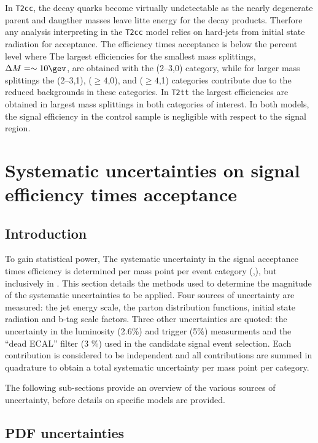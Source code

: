 In \verb!T2cc!, the decay quarks become virtually undetectable as 
the nearly degenerate parent and daugther masses leave litte energy for the decay 
products. Therfore any analysis interpreting in the \verb!T2cc! model 
relies on hard-\Pt jets from initial state radiation for acceptance. The 
efficiency times acceptance is below the percent level where The largest 
efficiencies for the smallest mass splittings, $\Delta M = \sim10\gev$, 
are obtained with the (2--3,0) category, while for larger mass splittings 
the (2--3,1), ($\geq 4$,0), and ($\geq 4$,1) categories contribute 
due to the reduced backgrounds in these categories. In \verb!T2tt! the largest
efficiencies are obtained in largest mass splittings in both categories of interest. 
In both models, the signal efficiency in the \mj control sample is negligible 
with respect to the signal region. 

\clearpage
\section{Systematic uncertainties on signal efficiency times 
  acceptance\label{sec:sms-syst}}

\subsection{Introduction} 

To gain statistical power, The systematic uncertainty in the signal 
acceptance times efficiency is determined per mass point per event 
category (\njet,\nb), but inclusively in \scalht . This section details the methods 
used to determine the magnitude of the systematic uncertainties to be applied. 
Four sources of uncertainty are measured: the jet energy scale,
the parton distribution functions, initial state radiation and b-tag scale
factors. Three other uncertainties are quoted: the uncertainty in the luminosity (2.6\%) and
trigger (5\%) measurments and the ``dead ECAL'' filter (3 \%) used in the candidate signal
event selection. Each contribution is considered to be independent 
and all contributions are summed in quadrature to obtain a total 
systematic uncertainty per mass point per category.

The following sub-sections provide an overview of the various sources of
uncertainty, before details on specific models are provided. 

\subsection{PDF uncertainties\label{sec:pdf-sets}}

